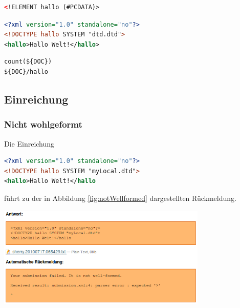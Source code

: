 \documentclass[a4paper]{scrartcl}
\begin{document}
\begin{lstlisting}[language=XML, captionpos=b, frame=tlRB, caption={Beispiel DTD.}]
<!ELEMENT hallo (#PCDATA)>
\end{lstlisting}

\begin{lstlisting}[language=XML, captionpos=b, frame=tlRB, caption=Modelllösung.]
<?xml version="1.0" standalone="no"?>
<!DOCTYPE hallo SYSTEM "dtd.dtd">
<hallo>Hallo Welt!</hallo>
\end{lstlisting}

\begin{lstlisting}[language=XML, captionpos=b, frame=tlRB, caption={Beispiel XPath-Ausdrücke.}]
count(${DOC})
${DOC}/hallo
\end{lstlisting}
	  
	  \subsection{Einreichung}
  	  \subsubsection{Nicht wohlgeformt}
  	  Die Einreichung
  	  \begin{lstlisting}[language=XML, captionpos=b, frame=tlRB, caption={Nicht wohlgeformte Einreichung.}]
<?xml version="1.0" standalone="no"?>
<!DOCTYPE hallo SYSTEM "myLocal.dtd">
<hallo>Hallo Welt!</hallo
\end{lstlisting}
  	  führt zu der in Abbildung \ref{fig:notWellformed} dargestellten Rückmeldung.
  	  \begin{center}
        \captionsetup{type=figure}
	      \includegraphics[width=0.75\textwidth]{images/notWellformed.png}
	      \label{fig:notWellformed}
      \end{center}
  	  
\end{document}
